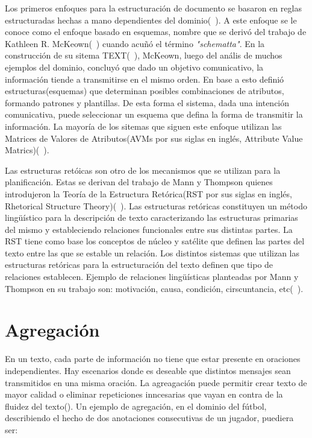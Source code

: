     Los primeros enfoques para la estructuración de documento se basaron en reglas estructuradas hechas a mano dependientes del dominio(~\cite{Gatt2018SurveyOT}). A este enfoque se le conoce como el enfoque basado en esquemas, nombre que 
se deriv\'o del trabajo de Kathleen R. McKeown(~\cite{mckeown1985discourse}) cuando acu\~n\'o el t\'ermino \textit{"schematta"}. En la construcci\'on de su sitema TEXT(~\cite{mckeown1985discourse}), McKeown, luego del an\'alis de muchos 
ejemplos del dominio, concluyó que dado un objetivo comunicativo, la información tiende a transmitirse en el mismo orden. En base a esto defini\'o estructuras(esquemas) que determinan posibles combinaciones de atributos, formando patrones 
y plantillas. De esta forma el sistema, dada una intenci\'on comunicativa, puede seleccionar un esquema que defina la forma de transmitir la información. La mayor\'ia de los sitemas que siguen este enfoque utilizan 
las Matrices de Valores de Atributos(AVMs por sus siglas en inglés, Attribute Value Matrics)(~\cite{Perera2017RecentAI}).

    Las estructuras ret\'oicas son otro de los mecanismos que se utilizan para la planificación. Estas se derivan del trabajo de Mann y Thompson quienes introdujeron la Teor\'ia de la Estructura Ret\'orica(RST por
sus siglas en inglés, Rhetorical Structure Theory)(~\cite{mann1988rhetorical}). Las estructuras ret\'oricas constituyen un m\'etodo lingüístico para la descripci\'on de texto caracterizando las estructuras primarias del mismo y estableciendo 
relaciones funcionales entre sus distintas partes. La RST tiene como base los conceptos de n\'ucleo y sat\'elite que definen las partes del texto entre las que se estable un relaci\'on. Los distintos sistemas que utilizan las estructuras ret\'oricas 
para la estructuraci\'on del texto definen que tipo de relaciones establecen. Ejemplo de relaciones lingüísticas planteadas por Mann y Thompson en su trabajo son: motivaci\'on, causa, condici\'on, cirscuntancia, etc(~\cite{mann1988rhetorical}). 

\section{Agregación}

    En un texto, cada parte de información no tiene que estar presente en oraciones independientes. Hay escenarios donde es 
deseable que distintos mensajes sean transmitidos en una misma oraci\'on. La agreagaci\'on puede permitir crear texto de mayor 
calidad o eliminar repeticiones inncesarias que vayan en contra de la fluidez del texto(\cite{Gatt2018SurveyOT}).
    Un ejemplo de agregaci\'on, en el dominio del f\'utbol, describiendo el hecho de dos anotaciones consecutivas de un jugador, puediera ser:

